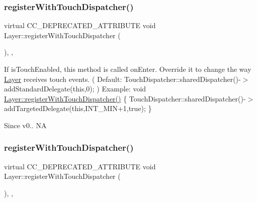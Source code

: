 \mbox{\label{classLayer_a988787d86ff8b8f1d0d75dcc6c2c181b}} 
\subsubsection{\texorpdfstring{register\+With\+Touch\+Dispatcher()}{registerWithTouchDispatcher()}\hspace{0.1cm}{\footnotesize\ttfamily [1/2]}}
{\footnotesize\ttfamily virtual C\+C\+\_\+\+D\+E\+P\+R\+E\+C\+A\+T\+E\+D\+\_\+\+A\+T\+T\+R\+I\+B\+U\+TE void Layer\+::register\+With\+Touch\+Dispatcher (\begin{DoxyParamCaption}{ }\end{DoxyParamCaption})\hspace{0.3cm}{\ttfamily [inline]}, {\ttfamily [final]}, {\ttfamily [virtual]}}

If is\+Touch\+Enabled, this method is called on\+Enter. Override it to change the way \hyperlink{classLayer}{Layer} receives touch events. ( Default\+: Touch\+Dispatcher\+::shared\+Dispatcher()-\/$>$add\+Standard\+Delegate(this,0); ) Example\+: void \hyperlink{classLayer_a988787d86ff8b8f1d0d75dcc6c2c181b}{Layer\+::register\+With\+Touch\+Dispatcher()} \{ Touch\+Dispatcher\+::shared\+Dispatcher()-\/$>$add\+Targeted\+Delegate(this,I\+N\+T\+\_\+\+M\+I\+N+1,true); \} \begin{DoxySince}{Since}
v0..  NA 
\end{DoxySince}
\mbox{\label{classLayer_a988787d86ff8b8f1d0d75dcc6c2c181b}} 
\subsubsection{\texorpdfstring{register\+With\+Touch\+Dispatcher()}{registerWithTouchDispatcher()}\hspace{0.1cm}{\footnotesize\ttfamily [2/2]}}
{\footnotesize\ttfamily virtual C\+C\+\_\+\+D\+E\+P\+R\+E\+C\+A\+T\+E\+D\+\_\+\+A\+T\+T\+R\+I\+B\+U\+TE void Layer\+::register\+With\+Touch\+Dispatcher (\begin{DoxyParamCaption}{ }\end{DoxyParamCaption})\hspace{0.3cm}{\ttfamily [inline]}, {\ttfamily [final]}, {\ttfamily [virtual]}}

